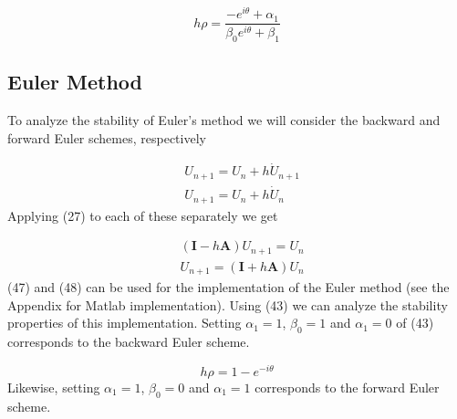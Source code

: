 \documentclass{article}
\begin{document}
				\begin{equation}
					 h\rho = \frac{-e^{i\theta}+\alpha_1}{ \beta_0e^{i\theta} + \beta_1}
				\end{equation}


	\subsection{Euler Method}
To analyze the stability of Euler's method we will consider the backward and forward Euler schemes, respectively

				\begin{align}
					&U_{n+1} = U_n + h\dot{U}_{n+1}\\
					&U_{n+1} = U_n + h\dot{U}_{n}
				\end{align}
Applying (27) to each of these separately we get

				\begin{align}
					&(\textbf{I} - h\textbf{A})U_{n+1} = U_n\\
					&U_{n+1} = (\textbf{I} + h\textbf{A})U_n
				\end{align}
(47) and (48) can be used for the implementation of the Euler method (see the Appendix for Matlab implementation). 
Using (43) we can analyze the stability properties of this implementation. Setting $\alpha_1 = 1$, $\beta_0 = 1$ and $\alpha_1 = 0$ of (43) corresponds to the backward Euler scheme.
 
				\begin{equation}
					 h\rho = 1 - e^{-i\theta}
				\end{equation}
Likewise, setting  $\alpha_1 = 1$, $\beta_0 = 0$ and $\alpha_1 = 1$ corresponds to the forward Euler scheme.
\end{document}
